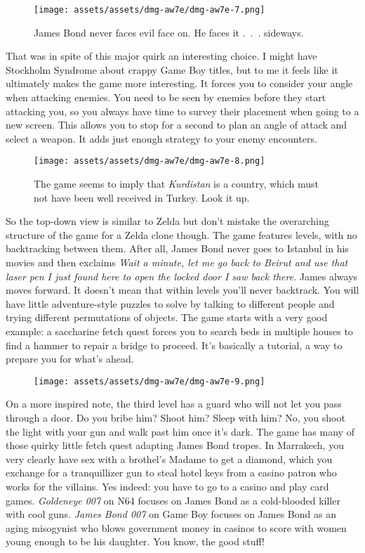 \documentclass{book}
\begin{document}
\begin{figure}[hbt]
\vskip 10pt
\centering \texttt{[image: assets/assets/dmg-aw7e/dmg-aw7e-7.png]}\par\pagetwodescription James Bond never faces evil face on. He faces it . . . sideways.
\vskip 6pt
\end{figure}

That was in spite of this major quirk an interesting choice. I might have Stockholm Syndrome about crappy Game Boy titles, but to me it feels like it ultimately makes the game more interesting. It forces you to consider your angle when attacking enemies. You need to be seen by enemies before they start attacking you, so you always have time to survey their placement when going to a new screen. This allows you to stop for a second to plan an angle of attack and select a weapon. It adds just enough strategy to your enemy encounters.

\begin{figure}[hbt]
\vskip 10pt
\centering \texttt{[image: assets/assets/dmg-aw7e/dmg-aw7e-8.png]}\par\pagetwodescription The game seems to imply that \emph{Kurdistan} is a country, which must not have been well received in Turkey. Look it up.
\vskip 6pt
\end{figure}

So the top-down view is similar to Zelda but don’t mistake the overarching structure of the game for a Zelda clone though. The game features levels, with no backtracking between them. After all, James Bond never goes to Istanbul in his movies and then exclaims \emph{Wait a minute, let me go back to Beirut and use that laser pen I just found here to open the locked door I saw back there}. James always moves forward. It doesn’t mean that within levels you’ll never backtrack. You will have little adventure-style puzzles to solve by talking to different people and trying different permutations of objects. The game starts with a very good example: a saccharine fetch quest forces you to search beds in multiple houses to find a hammer to repair a bridge to proceed. It’s basically a tutorial, a way to prepare you for what’s ahead.

\begin{figure}[hbt]
\vskip 10pt
\centering \texttt{[image: assets/assets/dmg-aw7e/dmg-aw7e-9.png]}
\vskip 6pt
\end{figure}
On a more inspired note, the third level has a guard who will not let you pass through a door. Do you bribe him? Shoot him? Sleep with him? No, you shoot the light with your gun and walk past him once it’s dark. The game has many of those quirky little fetch quest adapting James Bond tropes. In Marrakech, you very clearly have sex with a brothel’s Madame to get a diamond, which you exchange for a tranquillizer gun to steal hotel keys from a casino patron who works for the villains. Yes indeed: you have to go to a casino and play card games. \emph{Goldeneye 007} on N64 focuses on James Bond as a cold-blooded killer with cool guns. \emph{James Bond 007} on Game Boy focuses on James Bond as an aging misogynist who blows government money in casinos to score with women young enough to be his daughter. You know, the good stuff!
\end{document}
